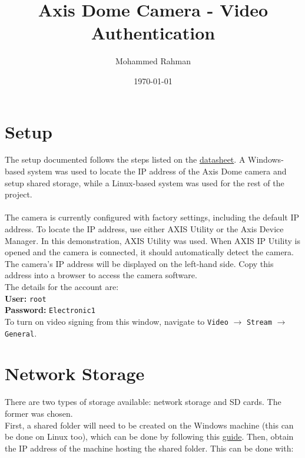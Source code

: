 \documentclass[a4paper,12pt]{article}
\title{Axis Dome Camera - Video Authentication}
\author{Mohammed Rahman}
\date{\today}
\begin{document}
\maketitle

\tableofcontents

\newpage
\section{Setup}
The setup documented follows the steps listed on the \href{https://help.axis.com/en-us/axis-p3265-lve}{datasheet}. A Windows-based system was used to locate the IP address of the Axis Dome camera and setup shared storage, while a Linux-based system was used for the rest of the project.\\ \\The camera is currently configured with factory settings, including the default IP address. To locate the IP address, use either AXIS Utility or the Axis Device Manager. In this demonstration, AXIS Utility was used. When AXIS IP Utility is opened and the camera is connected, it should automatically detect the camera. The camera's IP address will be displayed on the left-hand side. Copy this address into a browser to access the camera software. \\

\noindent The details for the account are:\\[1em]
\textbf{User:} \texttt{root}\\
\textbf{Password:} \texttt{Electronic1} \\ 

\noindent To turn on video signing from this window, navigate to \texttt{Video} \(\to\) \texttt{Stream} \(\to\) \texttt{General}.

\section{Network Storage}

There are two types of storage available: network storage and SD cards. The former was chosen. \\

First, a shared folder will need to be created on the Windows machine (this can be done on Linux too), which can be done by following this \href{https://bdsdoc.com/kb-articles/how-to-create-a-network-shared-folder/}{guide}. Then, obtain the IP address of the machine hosting the shared folder. This can be done with: \\
\end{document}
